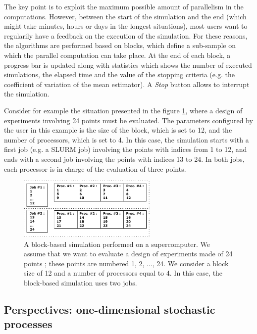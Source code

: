 \documentclass{uncecomp2019}
\begin{document}
The key point is to exploit the maximum possible amount of parallelism in 
the computations. 
However, between the start of the simulation and the end (which might take minutes, hours 
or days in the longest situations), most users want to regularily have a feedback on the 
execution of the simulation. 
For these reasons, the algorithms are performed based on blocks, which define a sub-sample 
on which the parallel computation can take place. 
At the end of each block, a progress bar is updated along with statistics which shows the 
number of executed simulations, the elapsed time and the value of the stopping criteria 
(e.g. the coefficient of variation of the mean estimator). 
A \emph{Stop} button allows to interrupt the simulation. 

Consider for example the situation presented in the figure \ref{fig-blockalgo}, 
where a design of experiments involving 24 points must be evaluated. 
The parameters configured by the user in this example is the size of the block, which is set 
to 12, and the number of processors, which is set to 4. 
In this case, the simulation starts with a first job (e.g. a SLURM job) involving the points with indices from 1 to 12, 
and ends with a second job involving the points with indices 13 to 24. 
In both jobs, each processor is in charge of the evaluation of three points. 

\begin{figure}
\centering
\includegraphics[width=0.6\textwidth]{figures/SALOME-OpenTURNS-simulation-byblock-shorter.pdf}
\caption{A block-based simulation performed on a supercomputer. We assume that we want 
to evaluate a design of experiments made of 24 points ; these points are numbered 1, 2, ..., 24. 
We consider a block size of 12 and a number of processors equal to 4. 
In this case, the block-based simulation uses two jobs.}
\label{fig-blockalgo}
\end{figure}



\subsection{Perspectives: one-dimensional stochastic processes}
\end{document}

